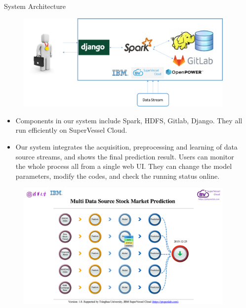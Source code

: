 \documentclass[final,hyperref={pdfpagelabels=false}]{beamer}
\begin{document}
\begin{frame}[t]
\begin{columns}[t]
\begin{column}{.02\textwidth}\end{column} %

\begin{column}{.445\textwidth} %





\begin{block}{System Architecture}
	\begin{figure}
		\includegraphics[width=0.7\linewidth]{system.png}
	\end{figure}
\begin{itemize}
\item Components in our system include Spark, HDFS, Gitlab, Django. They all run efficiently on SuperVessel Cloud. 
\item Our system integrates the acquisition, preprocessing and learning of data source streams, and shows the final prediction result. Users can monitor the whole process all from a single web UI. They can change the model parameters, modify the codes, and check the running status online.

\end{itemize}

\begin{figure}
		\includegraphics[width=0.5\linewidth]{webui.png}
	\end{figure}


\end{block}
\end{column}
\end{columns}
\end{frame}
\end{document}
